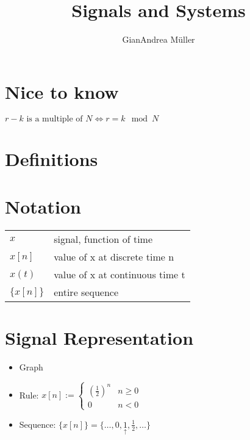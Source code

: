 \documentclass[8pt,a4paper]{scrartcl}
\begin{document}
\title{Signals and Systems}

\author{GianAndrea Müller}

\begin{multicols*}{4}
\maketitle
\tableofcontents
\end{multicols*}

\begin{multicols*}{3}

\section*{Nice to know}

$r-k \text{ is a multiple of $N$} \Leftrightarrow r=k\mod N$

\section*{Definitions}




\section*{Notation}

\begin{tabular}{ll}
$x$&signal, function of time\\
$x[n]$&value of x at discrete time n\\
$x(t)$&value of x at continuous time t\\
$\{x[n]\}$&entire sequence
\end{tabular}

\section*{Signal Representation}

\begin{itemize}
\item Graph
\item Rule: $x[n]:=\begin{cases}(\frac{1}{2})^n&n\geq 0\\0&n<0\end{cases}$
\item Sequence: $\{x[n]\}=\{\ldots,0,\underset{\uparrow}{1},\frac{1}{2},\ldots\}\qquad$
\end{itemize}


\end{multicols*}
\end{document}
